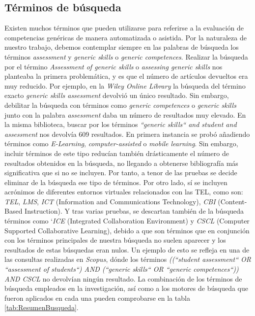 \subsection{Términos de búsqueda}
\label{sec:TerminosBusqueda}
Existen muchos términos que pueden utilizarse para referirse a la evaluación de competencias genéricas de manera automatizada o asistida. Por la naturaleza de nuestro trabajo, debemos contemplar siempre en las palabras de búsqueda los términos \emph{assessment} y \emph{generic skills} o \emph{generic competences}. Realizar la búsqueda por el término \emph{Assessment of generic skills} o \emph{assessing generic skills} nos planteaba la primera problemática, y es que el número de artículos devueltos era muy reducido. Por ejemplo, en la \emph{Wiley Online Library} la búsqueda del término exacto \emph{generic skills assessment} devolvió un único resultado. Sin embargo, debilitar la búsqueda con términos como \emph{generic competences} o \emph{generic skills} junto con la palabra \emph{assessment} daba un número de resultados muy elevado. En la misma biblioteca, buscar por los términos \emph{``generic skills`` and student and assessment} nos devolvía 609 resultados. En primera instancia se probó añadiendo términos como  \emph{E-Learning}, \emph{computer-assisted} o \emph{mobile learning}. Sin embargo, incluir términos de este tipo reducían también drásticamente el número de resultados obtenidos en la búsqueda, no llegando a obtenerse bibliografía más significativa que si no se incluyen. Por tanto, a tenor de las pruebas se decide eliminar de la búsqueda ese tipo de términos. Por otro lado, sí se incluyen acrónimos de diferentes entornos virtuales relacionados con las TEL, como son: \emph{TEL}, \emph{LMS}, \emph{ICT} (Information and Communications Technology), \emph{CBI} (Content-Based Instruction). Y tras varias pruebas, se descartan también de la búsqueda términos como `\emph{ICE} (Integrated Collaboration Environment) y \emph{CSCL} (Computer Supported Collaborative Learning), debido a que son términos que en conjunción con los términos principales de nuestra búsqueda no suelen aparecer y los resultados de estas búsquedas eran nulos. Un ejemplo de esto se refleja en una de las consultas realizadas en \emph{Scopus}, dónde los términos \emph{((``student assessment`` OR ``assessment of students``) AND (``generic skills`` OR ``generic competences``)) AND CSCL} no devolvían ningún resultado. La combinación de los términos de búsqueda empleados en la investigación, así como a los motores de búsqueda que fueron aplicados en cada una pueden comprobarse en la tabla \ref{tab:ResumenBusqueda}.

